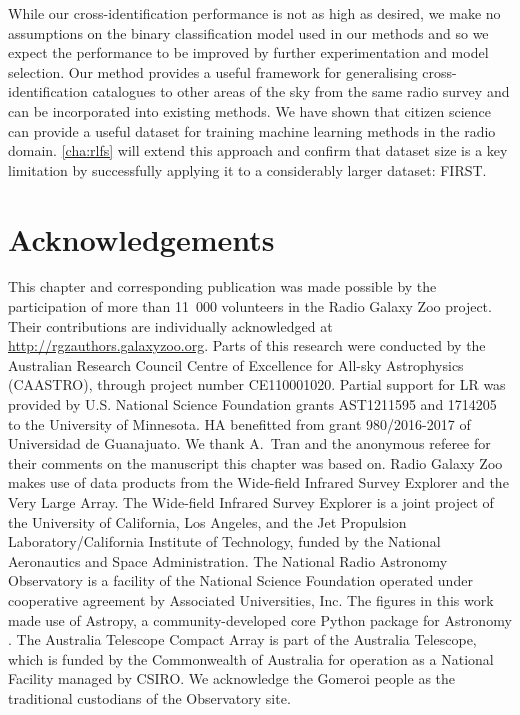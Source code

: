   While our cross-identification performance is not as high as desired, we
  make no assumptions on the binary classification model used in our methods
  and so we expect the performance to be improved by further experimentation
  and model selection. Our method provides a useful framework for generalising
  cross-identification catalogues to other areas of the sky from the same
  radio survey and can be incorporated into existing methods. {We have
  shown that citizen science can provide a useful dataset for training machine
  learning methods in the radio domain.} \autoref{cha:rlfs} will extend this
  approach and confirm that dataset size is a key limitation by successfully applying it to a considerably larger dataset: FIRST.

\section{Acknowledgements}

  This chapter and corresponding publication was made possible by the participation of more than
  11~000 volunteers in the Radio Galaxy Zoo project. Their contributions are
  individually acknowledged at \url{http://rgzauthors.galaxyzoo.org}. Parts of
  this research were conducted by the Australian Research Council Centre of
  Excellence for All-sky Astrophysics (CAASTRO), through project number
  CE110001020. Partial support for LR was provided by U.S. National Science
  Foundation grants AST1211595 and 1714205 to the University of Minnesota. HA
  benefitted from grant 980/2016-2017 of Universidad de Guanajuato. We thank
  A.~Tran and the anonymous referee for their comments on the manuscript this chapter was based on.
  Radio Galaxy Zoo makes use of
  data products from the Wide-field Infrared Survey Explorer and the Very
  Large Array. The Wide-field Infrared Survey Explorer is a joint project of
  the University of California, Los Angeles, and the Jet Propulsion
  Laboratory/California Institute of Technology, funded by the National
  Aeronautics and Space Administration. The National Radio Astronomy
  Observatory is a facility of the National Science Foundation operated under
  cooperative agreement by Associated Universities, Inc. The figures
  in this work made use of Astropy, a community-developed core Python package
  for Astronomy \citep{astropy}. The Australia Telescope Compact Array is part
  of the Australia Telescope, which is funded by the Commonwealth of Australia
  for operation as a National Facility managed by CSIRO. We acknowledge the Gomeroi people as the traditional custodians of the Observatory site.




